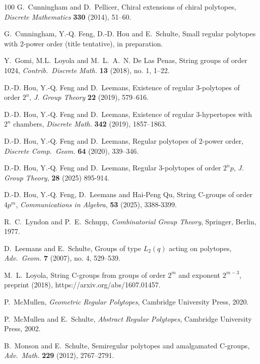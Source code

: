 \documentclass[12pt]{amsart}
\theoremstyle{definition}
\begin{document}
\begin{thebibliography}{100}
 G.~Cunningham and D.~Pellicer, Chiral extensions of chiral polytopes, \textit{Discrete Mathematics\/} {\bf 330} (2014), 51--60.

 G.~Cunningham, Y.-Q. Feng, D.-D. Hou and E.~Schulte, Small regular polytopes with 2-power order (title tentative), in preparation.

 Y.~Gomi, M.L.~Loyola and M.~L.~A.~N. De Las Penas, String groups of order 1024, \textit{Contrib.\ Discrete Math.} {\bf 13} (2018), no. 1, 1--22.

  D.-D. Hou, Y.-Q. Feng  and D.~Leemans, Existence of regular 3-polytopes of  order $2^n$, \textit{J. Group Theory} {\bf 22} (2019), 579--616.

  D.-D. Hou, Y.-Q. Feng  and D.~Leemans, Existence of regular 3-hypertopes with $2^n$ chambers, \textit{Discrete Math.} {\bf 342} (2019), 1857--1863.

  D.-D. Hou, Y.-Q. Feng  and D.~Leemans, Regular polytopes of 2-power order, \textit{Discrete Comp.\ Geom.} {\bf 64} (2020), 339--346.

  D.-D. Hou, Y.-Q. Feng  and D.~Leemans, Regular 3-polytopes of order $2^{n}p$, \textit{J. Group Theory}, {\bf 28} (2025) 895-914.

  D.-D. Hou, Y.-Q. Feng, D.~Leemans and Hai-Peng Qu, String C-groups of order $4p^m$, \textit{Communications in Algebra}, {\bf 53} (2025), 3388-3399.

 R.~C.~Lyndon and P.~E.~Schupp, \textit{Combinatorial Group Theory\/}, Springer, Berlin, 1977.

 D.~Leemans and E.~Schulte, Groups of type $L_2(q)$ acting on polytopes, \textit{Adv.\ Geom.} {\bf 7} (2007), no. 4, 529--539.

 M.~L.~Loyola, String C-groups from groups of order $2^m$ and exponent $2^{m-3}$, preprint (2018), https://arxiv.org/abs/1607.01457.

 P.~McMullen, \textit{Geometric Regular Polytopes}, Cambridge University Press, 2020.

 P.~McMullen and E.~Schulte, \textit{Abstract Regular Polytopes}, Cambridge University Press, 2002.

 B.~Monson and E.~Schulte, Semiregular polytopes and amalgamated C-groups, \textit{Adv.\ Math.} {\bf 229} (2012), 2767--2791.


\end{thebibliography}
\end{document}
